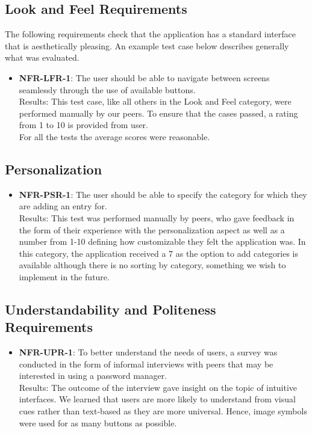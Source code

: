 \documentclass[12pt, titlepage]{article}
\begin{document}
	\subsection{Look and Feel Requirements}		
		The following requirements check that the application has a standard interface that is aesthetically pleasing. An example test case below describes generally what was evaluated.

		\begin{itemize}
		
			\item \textbf{NFR-LFR-1}: The user should be able to navigate between screens seamlessly through the use of available buttons. \\
			Results: This test case, like all others in the Look and Feel category, were performed manually by our peers. To ensure that the cases passed, a rating from 1 to 10 is provided from user.\\
			For all the tests the average scores were reasonable. 

		\end{itemize}

	\subsection{Personalization}

		\begin{itemize}

			\item \textbf{NFR-PSR-1}: The user should be able to specify the category for which they are adding an entry for. \\
			Results: This test was performed manually by peers, who gave feedback in the form of their experience with the personalization aspect as well as a number from 1-10 defining how customizable they felt the application was. In this category, the application received a 7 as the option to add categories is available although there is no sorting by category, something we wish to implement in the future.


		\end{itemize}

	\subsection{Understandability and Politeness Requirements}

		\begin{itemize}

			\item \textbf{NFR-UPR-1}: To better understand the needs of users, a survey was conducted in the form of informal interviews with peers that may be interested in using a password manager.\\
			Results: The outcome of the interview gave insight on the topic of intuitive interfaces. We learned that users are more likely to understand from visual cues rather than text-based as they are more universal. Hence, image symbols were used for as many buttons as possible.

		\end{itemize}
\end{document}
